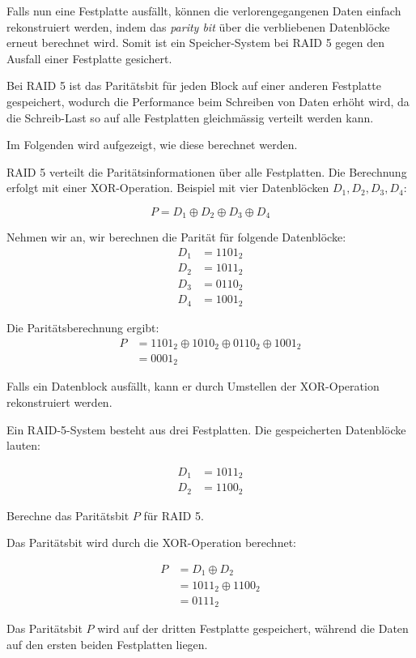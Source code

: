 Falls nun eine Festplatte ausfällt, können die verlorengegangenen Daten einfach rekonstruiert werden, indem das \textit{parity bit} über die verbliebenen Datenblöcke erneut berechnet wird. Somit ist ein Speicher-System bei RAID 5 gegen den Ausfall einer Festplatte gesichert.

Bei RAID 5 ist das Paritätsbit für jeden Block auf einer anderen Festplatte gespeichert, wodurch die Performance beim Schreiben von Daten erhöht wird, da die Schreib-Last so auf alle Festplatten gleichmässig verteilt werden kann.

Im Folgenden wird aufgezeigt, wie diese berechnet werden.

RAID 5 verteilt die Paritätsinformationen über alle Festplatten. Die Berechnung erfolgt mit einer XOR-Operation. Beispiel mit vier Datenblöcken $D_1, D_2, D_3, D_4$:

\begin{equation}
    P = D_1 \oplus D_2 \oplus D_3 \oplus D_4
\end{equation}

\begin{myexample}
Nehmen wir an, wir berechnen die Parität für folgende Datenblöcke:
\begin{align*}
    D_1 & = 1101_2 \\
    D_2 & = 1011_2 \\
    D_3 & = 0110_2 \\
    D_4 & = 1001_2
\end{align*}

Die Paritätsberechnung ergibt:
\begin{align*}
    P & = 1101_2 \oplus 1010_2 \oplus 0110_2 \oplus 1001_2 \\
      & = 0001_2
\end{align*}
\end{myexample}

Falls ein Datenblock ausfällt, kann er durch Umstellen der XOR-Operation rekonstruiert werden.

\begin{myexercise}
    Ein RAID-5-System besteht aus drei Festplatten. Die gespeicherten Datenblöcke lauten:

    \begin{align*}
        D_1 & = 1011_2 \\
        D_2 & = 1100_2
    \end{align*}

    Berechne das Paritätsbit $P$ für RAID 5.

    \begin{myanswer}
        Das Paritätsbit wird durch die XOR-Operation berechnet:

        \begin{align*}
            P & = D_1 \oplus D_2       \\
              & = 1011_2 \oplus 1100_2 \\
              & = 0111_2
        \end{align*}

        Das Paritätsbit $P$ wird auf der dritten Festplatte gespeichert, während die Daten auf den ersten beiden Festplatten liegen.
    \end{myanswer}
\end{myexercise}


